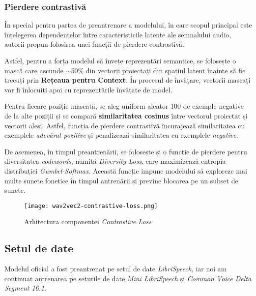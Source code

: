 \subsubsection{Pierdere contrastivă}
În special pentru partea de preantrenare a modelului, în care scopul principal este înțelegerea
dependențelor între caracteristicile latente ale semnalului audio, autorii propun folosirea unei
funcții de pierdere contrastivă. 
\par
Astfel, pentru a forța modelul să învețe reprezentări semantice, se folosește o mască care ascunde
$\sim$50\% din vectorii proiectați din spațiul latent înainte să fie trecuți prin \textbf{Rețeaua pentru Context}.
În procesul de învățare, vectorii mascați vor fi înlocuiți apoi cu reprezentările învățate de model.

\par
Pentru fiecare poziție mascată, se aleg uniform aleator 100 de exemple negative de la alte poziții
și se compară \textbf{similaritatea cosinus} între vectorul proiectat și vectorii aleși.
Astfel, funcția de pierdere contrastivă încurajează similaritatea cu exemplele \textit{adevărat pozitive}
și penalizează similaritatea cu exemplele \textit{negative}.
\par
De asemenea, în timpul preantrenării, se folosește și o funcție de pierdere pentru diversitatea \textit{codewords}, numită
\textit{Diversity Loss}, care maximizează entropia distribuției \textit{Gumbel-Softmax}. Această funcție
impune modelului să exploreze mai multe sunete fonetice în timpul antrenării și previne blocarea pe un
subset de sunete.

\vspace{1em}
\begin{figure}[h]
    \centering 
    \texttt{[image: wav2vec2-contrastive-loss.png]}
    \caption{Arhitectura componentei \textit{Contrastive Loss} \protect\footnotemark[1]}
    \label{fig:wav2vec2-contrastive-loss}
\end{figure}
\vspace{1em}


\subsection{Setul de date}
Modelul oficial a fost preantrenat pe setul de date \textit{LibriSpeech}, iar noi am continuat
antrenarea pe seturile de date \textit{Mini LibriSpeech} și \textit{Common Voice Delta Segment 16.1}.

